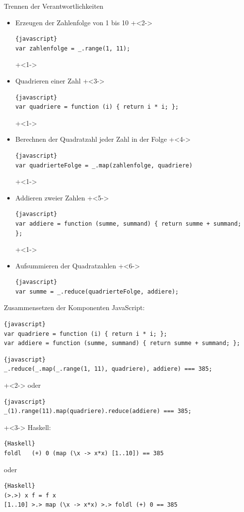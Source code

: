 \begin{frame}[fragile]{Trennen der Verantwortlichkeiten}
\begin{itemize}
\item Erzeugen der Zahlenfolge von 1 bis 10
\onslide+<2->
\begin{lstlisting}{javascript}
var zahlenfolge = _.range(1, 11);
\end{lstlisting}
\onslide+<1->
\item Quadrieren einer Zahl
\onslide+<3->
\begin{lstlisting}{javascript}
var quadriere = function (i) { return i * i; };
\end{lstlisting}
\onslide+<1->
\item Berechnen der Quadratzahl jeder Zahl in der Folge
\onslide+<4->
\begin{lstlisting}{javascript}
var quadrierteFolge = _.map(zahlenfolge, quadriere)
\end{lstlisting}
\onslide+<1->
\item Addieren zweier Zahlen
\onslide+<5->
\begin{lstlisting}{javascript}
var addiere = function (summe, summand) { return summe + summand; };
\end{lstlisting}
\onslide+<1->
\item Aufsummieren der Quadratzahlen
\onslide+<6->
\begin{lstlisting}{javascript}
var summe = _.reduce(quadrierteFolge, addiere);
\end{lstlisting}
\end{itemize}

\end{frame}

\begin{frame}[fragile]{Zusammensetzen der Komponenten}
JavaScript:
\begin{lstlisting}{javascript}
var quadriere = function (i) { return i * i; };
var addiere = function (summe, summand) { return summe + summand; };
\end{lstlisting}

\begin{lstlisting}{javascript}
_.reduce(_.map(_.range(1, 11), quadriere), addiere) === 385;
\end{lstlisting}

\onslide+<2->
oder

\begin{lstlisting}{javascript}
_(1).range(11).map(quadriere).reduce(addiere) === 385;
\end{lstlisting}

\onslide+<3->
Haskell:
\begin{lstlisting}{Haskell}
foldl	(+) 0 (map (\x -> x*x) [1..10]) == 385
\end{lstlisting}
oder
\begin{lstlisting}{Haskell}
(>.>) x f = f x
[1..10] >.> map (\x -> x*x) >.> foldl (+) 0 == 385
\end{lstlisting}

\end{frame}

